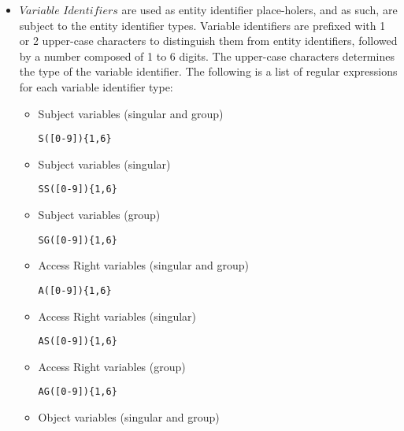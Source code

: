 \documentclass[10pt, twocolumn]{article}
\begin{document}
\begin{itemize}
              \begin{verbatim}[a-z]([a-zA-Z0-9_]{0,127}\end{verbatim}
 
            \item
              $Variable$ $Identifiers$ are used as entity identifier
              place-holers, and as such, are subject to the entity identifier
              types. Variable identifiers are prefixed with 1 or 2 upper-case
              characters to distinguish them from entity identifiers, followed
              by a number composed of 1 to 6 digits. The upper-case characters
              determines the type of the variable identifier. The following is
              a list of regular expressions for each variable identifier type:

              \begin{itemize}
                \item
                  Subject variables (singular and group)

                  \begin{verbatim}S([0-9]){1,6}\end{verbatim}
                \item
                  Subject variables (singular)

                  \begin{verbatim}SS([0-9]){1,6}\end{verbatim}
                \item
                  Subject variables (group)

                  \begin{verbatim}SG([0-9]){1,6}\end{verbatim}
                \item
                  Access Right variables (singular and group)

                  \begin{verbatim}A([0-9]){1,6}\end{verbatim}
                \item
                  Access Right variables (singular)

                  \begin{verbatim}AS([0-9]){1,6}\end{verbatim}
                \item
                  Access Right variables (group)

                  \begin{verbatim}AG([0-9]){1,6}\end{verbatim}
                \item
                  Object variables (singular and group)


\end{itemize}
\end{itemize}
\end{document}
